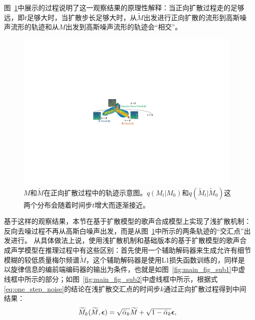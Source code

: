图~\ref{fig:manifolds}中展示的过程说明了这一观察结果的原理性解释：当正向扩散过程走的足够远，即$t$足够大时，当扩散步长足够大时，从$\widetilde{M}$出发进行正向扩散的流形到高斯噪声流形的轨迹和从$M$出发到高斯噪声流形的轨迹会``相交''。
\begin{figure}[!h]
    \centering
    \includegraphics[width=0.99\textwidth]{figure/svs/manifold.pdf} %
    \caption{$M$和$\widetilde{M}$在正向扩散过程中的轨迹示意图。$q(M_t| M_0)$和$q(\widetilde{M}_t| \widetilde{M}_0)$这两个分布会随着时间步$t$增大而逐渐接近。}
    \label{fig:manifolds}
\end{figure}
基于这样的观察结果，本节在基于扩散模型的歌声合成模型上实现了浅扩散机制\citep{diffsinger}：反向去噪过程不再从高斯白噪声出发，而是从图~\ref{fig:manifolds}中所示的两条轨迹的``交汇点''出发进行。
从具体做法上说，使用浅扩散机制和基础版本的基于扩散模型的歌声合成声学模型在推理过程中有这些区别：首先使用一个辅助解码器来生成允许有细节模糊的较低质量梅尔频谱$\widetilde{M}$，这个辅助解码器是使用L1损失函数训练的，同样是以旋律信息的编前端编码器的输出为条件，也就是如图~\ref{fig:main_fig_sub1}中虚线框中所示的部分；如图~\ref{fig:main_fig_sub2}中虚线框中所示，根据式\eqref{eq:one_step_noise}的结论在浅扩散交汇点的时间步$k$通过正向扩散过程得到中间结果：
\begin{equation}
\widetilde{M}_k(\widetilde{M}, {\boldsymbol{\epsilon}}) = \sqrt{\bar\alpha_k}\widetilde{M} + \sqrt{1-\bar\alpha_k}{\boldsymbol{\epsilon}},
\end{equation}
